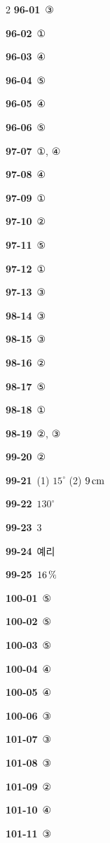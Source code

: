 \documentclass[10pt,a4paper]{article}
\begin{document}
\begin{multicols}{2}
\noindent\textbf{96-01}\ ③\par
\noindent\textbf{96-02}\ ①\par
\noindent\textbf{96-03}\ ④\par
\noindent\textbf{96-04}\ ⑤\par
\noindent\textbf{96-05}\ ④\par
\noindent\textbf{96-06}\ ⑤\par
\noindent\textbf{97-07}\ ①, ④\par
\noindent\textbf{97-08}\ ④\par
\noindent\textbf{97-09}\ ①\par
\noindent\textbf{97-10}\ ②\par
\noindent\textbf{97-11}\ ⑤\par
\noindent\textbf{97-12}\ ①\par
\noindent\textbf{97-13}\ ③\par
\noindent\textbf{98-14}\ ③\par
\noindent\textbf{98-15}\ ③\par
\noindent\textbf{98-16}\ ②\par
\noindent\textbf{98-17}\ ⑤\par
\noindent\textbf{98-18}\ ①\par
\noindent\textbf{98-19}\ ②, ③\par
\noindent\textbf{99-20}\ ②\par
\noindent\textbf{99-21}\ (1) $15^\circ$ (2) $9\mkern3mu \mathrm{cm}$\par
\noindent\textbf{99-22}\ $130^\circ$\par
\noindent\textbf{99-23}\ $3$\par
\noindent\textbf{99-24}\ 예리\par
\noindent\textbf{99-25}\ $16\mkern3mu \%$\par
\noindent\textbf{100-01}\ ⑤\par
\noindent\textbf{100-02}\ ⑤\par
\noindent\textbf{100-03}\ ⑤\par
\noindent\textbf{100-04}\ ④\par
\noindent\textbf{100-05}\ ④\par
\noindent\textbf{100-06}\ ③\par
\noindent\textbf{101-07}\ ③\par
\noindent\textbf{101-08}\ ③\par
\noindent\textbf{101-09}\ ②\par
\noindent\textbf{101-10}\ ④\par
\noindent\textbf{101-11}\ ③\par

\end{multicols}
\end{document}
